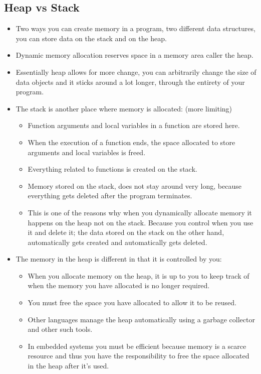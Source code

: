 \subsection{Heap vs Stack}
\begin{itemize}
    \item Two ways you can create memory in a program, two different data structures, you can store data on the stack and on the heap. 
    \item Dynamic memory allocation reserves space in a memory area caller the heap. 
    \item Essentially heap allows for more change, you can arbitrarily change the size of data objects and it sticks around a lot longer, through the entirety of your program. 
    \item The stack is another place where memory is allocated: (more limiting)
        \begin{itemize}
            \item Function arguments and local variables in a function are stored here. 
            \item When the execution of a function ends, the space allocated to store arguments and local variables is freed. 
            \item Everything related to functions is created on the stack.
            \item Memory stored on the stack, does not stay around very long, because everything gets deleted after the program terminates. 
            \item This is one of the reasons why when you dynamically allocate memory it happens on the heap not on the stack. Because you control when you use it and delete it; the data stored on the stack on the other hand, automatically gets created and automatically gets deleted. 
        \end{itemize}
    
    \item The memory in the heap is different in that it is controlled by you:
        \begin{itemize}
            \item When you allocate memory on the heap, it is up to you to keep track of when the memory you have allocated is no longer required. 
            \item You must free the space you have allocated to allow it to be reused.
            \item Other languages manage the heap automatically using a garbage collector and other such tools. 
            \item In embedded systems you must be efficient because memory is a scarce resource and thus you have the responsibility to free the space allocated in the heap after it's used.  
        \end{itemize}
\end{itemize}


